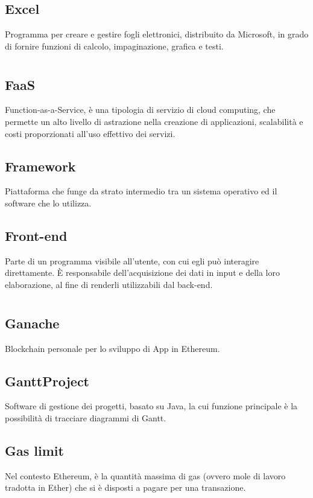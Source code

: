 	\subsection*{Excel}
	Programma per creare e gestire fogli elettronici, distribuito da Microsoft, in grado di fornire funzioni di calcolo, impaginazione, grafica e testi.
\pagebreak
\section[F]{}
	\subsection*{FaaS}
	Function-as-a-Service, è una tipologia di servizio di cloud computing, che permette un alto livello di astrazione nella creazione di applicazioni, scalabilità e costi proporzionati all’uso effettivo dei servizi.
	\subsection*{Framework}
	Piattaforma che funge da strato intermedio tra un sistema operativo ed il software che lo utilizza.
	\subsection*{Front-end}
	Parte di un programma visibile all’utente, con cui egli può interagire direttamente. È responsabile dell’acquisizione dei dati in input e della loro elaborazione, al fine di renderli utilizzabili dal back-end.
\pagebreak
\section[G]{}
	\subsection*{Ganache}
	Blockchain personale per lo sviluppo di \DJ{}App in Ethereum.  
	\subsection*{GanttProject}
	Software di gestione dei progetti, basato su Java, la cui funzione principale è la possibilità di tracciare diagrammi di Gantt.
	\subsection*{Gas limit}
	Nel contesto Ethereum, è la quantità massima di gas (ovvero mole di lavoro tradotta in Ether) che si è disposti a pagare per una transazione.
